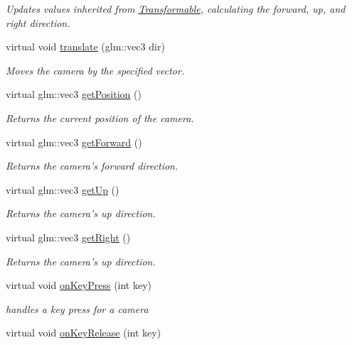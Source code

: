 \begin{DoxyCompactItemize}
\begin{DoxyCompactList}\small\item\em Updates values inherited from \hyperlink{class_transformable}{Transformable}, calculating the forward, up, and right direction. \end{DoxyCompactList}\item 
virtual void \hyperlink{class_camera_ab839e9d43668ba6ea13c72245ece7131}{translate} (glm\-::vec3 dir)
\begin{DoxyCompactList}\small\item\em Moves the camera by the specified vector. \end{DoxyCompactList}\item 
virtual glm\-::vec3 \hyperlink{class_camera_a520c5a7413b3e704f2f442288db17bcf}{get\-Position} ()
\begin{DoxyCompactList}\small\item\em Returns the current position of the camera. \end{DoxyCompactList}\item 
virtual glm\-::vec3 \hyperlink{class_camera_a8e94dcd032d92a96cfe8e13cab9c31a0}{get\-Forward} ()
\begin{DoxyCompactList}\small\item\em Returns the camera's forward direction. \end{DoxyCompactList}\item 
virtual glm\-::vec3 \hyperlink{class_camera_ab467583121fc13126a24798d17090b4d}{get\-Up} ()
\begin{DoxyCompactList}\small\item\em Returns the camera's up direction. \end{DoxyCompactList}\item 
virtual glm\-::vec3 \hyperlink{class_camera_a21c35c617f5795382a7553bcbadee849}{get\-Right} ()
\begin{DoxyCompactList}\small\item\em Returns the camera's up direction. \end{DoxyCompactList}\item 
virtual void \hyperlink{class_camera_a10b868fe859868ce30c7b4523009e315}{on\-Key\-Press} (int key)
\begin{DoxyCompactList}\small\item\em handles a key press for a camera \end{DoxyCompactList}\item 
virtual void \hyperlink{class_camera_a5106fd522318a7d5bf588648b7afa996}{on\-Key\-Release} (int key)

\end{DoxyCompactItemize}
